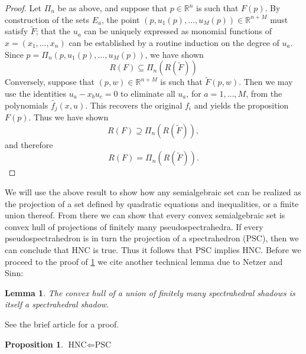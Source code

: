 \documentclass[11pt]{article} %
\newtheorem{prop}[thm]{Proposition}
\newtheorem{lem}[thm]{Lemma}
\newcommand{\R}{\mathbb{R}}
\begin{document}
\begin{proof}
Let $\Pi_n$ be as above, and suppose that $p\in \R^n$ is such that $F(p)$. By construction of the sets $E_a$, the point $(p,u_1(p),\ldots,u_M(p)) \in \R^{n+M}$ must satisfy $\tilde{F}$; that the $u_a$ can be uniquely expressed as monomial functions of $x = (x_1,\ldots,x_n)$ can be established by a routine induction on the degree of $u_a$.  Since $p = \Pi_n(p,u_1(p),\ldots,u_M(p))$, we have shown 
\[R(F) \subseteq \Pi_n(R(\tilde{F}))\]
Conversely, suppose that $(p,w) \in \R^{n+M}$ is such that $\tilde{F}(p,w)$. Then we may use the identities $u_a - x_bu_c = 0$ to eliminate all $u_a$, for $a = 1,\ldots,M$, from the polynomials $\tilde{f_j}(x,u)$. This recovers the original $f_i$ and yields the proposition $F(p)$. Thus we have shown
\[R(F) \supseteq \Pi_n(R(\tilde{F})),\]
and therefore
\[R(F) = \Pi_n(R(\tilde{F})).\]

\end{proof}

We will use the above result to show how any semialgebraic set can be realized as the projection of a set defined by quadratic equations and inequalities, or a finite union thereof. From there we can show that every convex semialgebraic set is convex hull of projections of finitely many pseudospectrahedra. If every pseudospectrahedron is in turn the projection of a spectrahedron (PSC), then we can conclude that HNC is true. Thus it follows that PSC implies HNC. Before we proceed to the proof of \ref{PSCHNC} we cite another technical lemma due to Netzer and Sinn:

\begin{lem}The convex hull of a union of finitely many spectrahedral shadows is itself a spectrahedral shadow.
\label{NetzerS}
\end{lem}
See the brief article \cite{NetzerSinn} for a proof.

\begin{prop}
$\text{HNC} \Leftarrow \text{PSC}$
\label{PSCHNC}
\end{prop}
\end{document}
